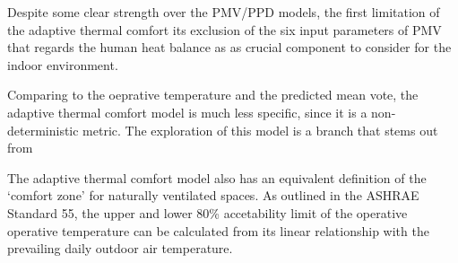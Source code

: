     Despite some clear strength over the PMV/PPD models, the first limitation of the adaptive thermal comfort its exclusion of the six input parameters of PMV that regards the human heat balance as as crucial component to consider for the indoor environment.

    Comparing to the oeprative temperature and the predicted mean vote, the adaptive thermal comfort model is much less specific, since it is a non-deterministic metric. The exploration of this model is a branch that stems out from

    The adaptive thermal comfort model also has an equivalent definition of the `comfort zone' for naturally ventilated spaces\cite{ashrae_ansi/ashrae_2013}. As outlined in the ASHRAE Standard 55, the upper and lower 80\% accetability limit of the operative operative temperature can be calculated from its linear relationship with the prevailing daily outdoor air temperature. 
